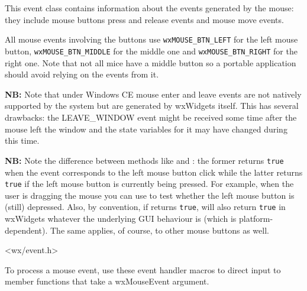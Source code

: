 \section{}\label{wxmouseevent}

This event class contains information about the events generated by the mouse:
they include mouse buttons press and release events and mouse move events.

All mouse events involving the buttons use {\tt wxMOUSE\_BTN\_LEFT} for the
left mouse button, {\tt wxMOUSE\_BTN\_MIDDLE} for the middle one and
{\tt wxMOUSE\_BTN\_RIGHT} for the right one. Note that not all mice have a
middle button so a portable application should avoid relying on the events from
it.

{\bf NB:} Note that under Windows CE mouse enter and leave events are not natively supported
by the system but are generated by wxWidgets itself. This has several
drawbacks: the LEAVE\_WINDOW event might be received some time after the mouse
left the window and the state variables for it may have changed during this
time.

{\bf NB:} Note the difference between methods like
 and
: the former returns {\tt true}
when the event corresponds to the left mouse button click while the latter
returns {\tt true} if the left mouse button is currently being pressed. For
example, when the user is dragging the mouse you can use
 to test
whether the left mouse button is (still) depressed. Also, by convention, if
 returns {\tt true},
 will also return {\tt true} in
wxWidgets whatever the underlying GUI behaviour is (which is
platform-dependent). The same applies, of course, to other mouse buttons as
well.




<wx/event.h>


To process a mouse event, use these event handler macros to direct input to member
functions that take a wxMouseEvent argument.

